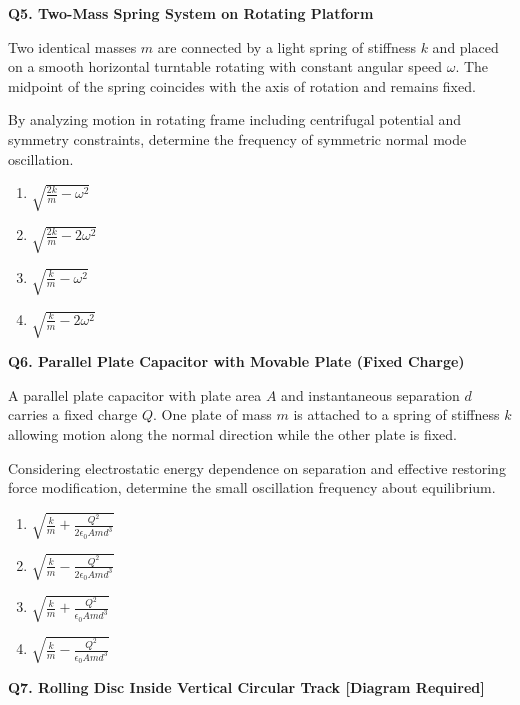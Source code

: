 \documentclass[12pt]{article}
\begin{document}

\textbf{Q5. Two-Mass Spring System on Rotating Platform}

Two identical masses $m$ are connected by a light spring of stiffness $k$ and placed on a smooth horizontal turntable rotating with constant angular speed $\omega$. The midpoint of the spring coincides with the axis of rotation and remains fixed.  

By analyzing motion in rotating frame including centrifugal potential and symmetry constraints, determine the frequency of symmetric normal mode oscillation.

\begin{enumerate}
\item[(A)] $\sqrt{\frac{2k}{m}-\omega^2}$
\item[(B)] $\sqrt{\frac{2k}{m}-2\omega^2}$
\item[(C)] $\sqrt{\frac{k}{m}-\omega^2}$
\item[(D)] $\sqrt{\frac{k}{m}-2\omega^2}$
\end{enumerate}


\textbf{Q6. Parallel Plate Capacitor with Movable Plate (Fixed Charge)}

A parallel plate capacitor with plate area $A$ and instantaneous separation $d$ carries a fixed charge $Q$. One plate of mass $m$ is attached to a spring of stiffness $k$ allowing motion along the normal direction while the other plate is fixed.  

Considering electrostatic energy dependence on separation and effective restoring force modification, determine the small oscillation frequency about equilibrium.

\begin{enumerate}
\item[(A)] $\sqrt{\frac{k}{m}+\frac{Q^2}{2\epsilon_0Am d^3}}$
\item[(B)] $\sqrt{\frac{k}{m}-\frac{Q^2}{2\epsilon_0Am d^3}}$
\item[(C)] $\sqrt{\frac{k}{m}+\frac{Q^2}{\epsilon_0Am d^3}}$
\item[(D)] $\sqrt{\frac{k}{m}-\frac{Q^2}{\epsilon_0Am d^3}}$
\end{enumerate}


\textbf{Q7. Rolling Disc Inside Vertical Circular Track [Diagram Required]}
\end{document}
